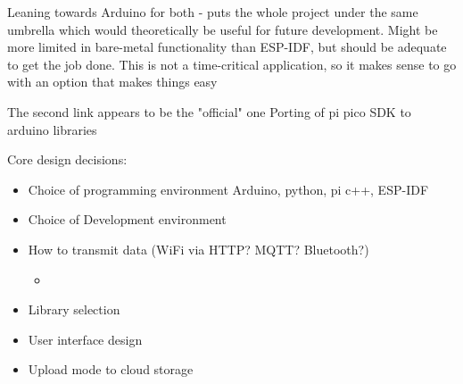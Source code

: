 Leaning towards Arduino for both - puts the whole project under the same umbrella which would theoretically be useful for future development.
Might be more limited in bare-metal functionality than ESP-IDF, but should be adequate to get the job done. This is not a time-critical application, so it makes sense to go with an option that makes things easy

The second link appears to be the "official" one
Porting of pi pico SDK to arduino libraries


Core design decisions:

\begin{itemize}
    \item Choice of programming environment {Arduino, python, pi c++, ESP-IDF}
    \item Choice of Development environment
    \item How to transmit data (WiFi via HTTP? MQTT? Bluetooth?)
    \begin{itemize}
        \item %
    \end{itemize}
    \item Library selection
    \item User interface design
    \item Upload mode to cloud storage
\end{itemize}
\ifstandalone

\printnoidxglossary[type=\acronymtype,nonumberlist]
\fi

